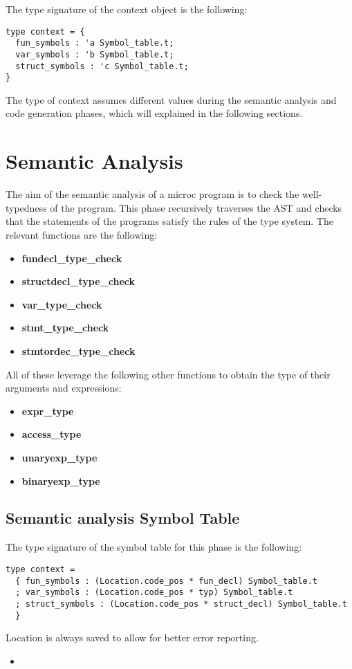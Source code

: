 \documentclass{article}
\begin{document}
The type signature of the context object is the following:
\begin{lstlisting}
type context = {
  fun_symbols : 'a Symbol_table.t;
  var_symbols : 'b Symbol_table.t;
  struct_symbols : 'c Symbol_table.t;
}
\end{lstlisting}

The type of context assumes different values during the semantic analysis and code generation phases, which will explained in the following sections.
\section{Semantic Analysis}
The aim of the semantic analysis of a microc program is to check the well-typedness of the program.
This phase recursively traverses the AST and checks that the statements of the programs satisfy the rules of the type system.
The relevant functions are the following:

\begin{itemize}
  \item \textbf{fundecl\_type\_check}
  \item \textbf{structdecl\_type\_check}
  \item \textbf{var\_type\_check}
  \item \textbf{stmt\_type\_check}
  \item \textbf{stmtordec\_type\_check}
\end{itemize}
All of these leverage the following other functions to obtain the type of their arguments and expressions:
\begin{itemize}
  \item \textbf{expr\_type}
  \item \textbf{access\_type}
  \item \textbf{unaryexp\_type}
  \item \textbf{binaryexp\_type}
\end{itemize}

\subsection*{Semantic analysis Symbol Table}
The type signature of the symbol table for this phase is the following:

\begin{lstlisting}[basicstyle=\ttfamily\fontsize{9pt}{4pt}, keywordstyle=\color{blue}, commentstyle=\color{green}]
type context =
  { fun_symbols : (Location.code_pos * fun_decl) Symbol_table.t
  ; var_symbols : (Location.code_pos * typ) Symbol_table.t
  ; struct_symbols : (Location.code_pos * struct_decl) Symbol_table.t
  }
\end{lstlisting}
Location is always saved to allow for better error reporting.
\begin{itemize}
  \item
  \end{itemize}
\end{document}
